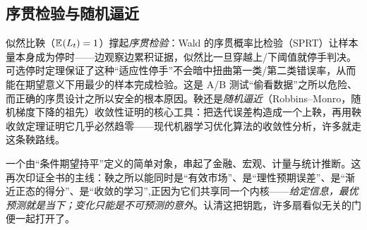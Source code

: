 \subsection{序贯检验与随机逼近}

似然比鞅（$\mathbb{E}_{}\!\left(L_t\right)=1$）撑起\emph{序贯检验}：Wald 的序贯概率比检验（SPRT）让样本量本身成为停时——边观察边累积证据，似然比一旦穿越上/下阈值就停手判决。可选停时定理保证了这种``适应性停手''不会暗中扭曲第一类/第二类错误率，从而能在期望意义下用最少的样本完成检验。这是 A/B 测试``偷看数据''之所以危险、而正确的序贯设计之所以安全的根本原因。鞅还是\emph{随机逼近}（Robbins--Monro，随机梯度下降的祖先）收敛性证明的核心工具：把迭代误差构造成一个上鞅，再用鞅收敛定理证明它几乎必然趋零——现代机器学习优化算法的收敛性分析，许多就走这条鞅路线。

\medskip

一个由``条件期望持平''定义的简单对象，串起了金融、宏观、计量与统计推断。这再次印证全书的主线：鞅之所以能同时是``有效市场''、是``理性预期误差''、是``渐近正态的得分''、是``收敛的学习'',正因为它们共享同一个内核——\emph{给定信息，最优预测就是当下；变化只能是不可预测的意外}。认清这把钥匙，许多扇看似无关的门便一起打开了。
